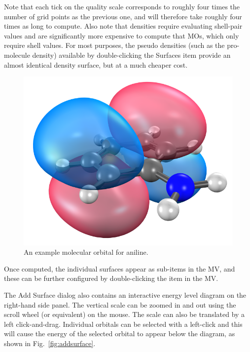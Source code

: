 \documentclass[a4paper,12pt]{article}
\begin{document}
Note that each tick on the quality scale corresponds to roughly four times the
number of grid points as the previous one, and will therefore take roughly four
times as long to compute.  Also note that densities require evaluating
shell-pair values and are significantly more expensive to compute that MOs,
which only require shell values.  For most purposes, the pseudo densities (such
as the pro-molecule density) available by double-clicking the Surfaces item
provide an almost identical density surface, but at a much cheaper cost.

\begin{figure}[h]
\begin{center}
\includegraphics[scale=0.32]{figures/Orbital.png}
\caption{An example molecular orbital for aniline.}
\label{fig:mo}
\end{center}
\end{figure}

Once computed, the individual surfaces appear as sub-items in the MV, and these
can be further configured by double-clicking the item in the MV.

The Add Surface dialog also contains an interactive energy level diagram on the
right-hand side panel.  The vertical scale can be zoomed in and out using the
scroll wheel (or equivalent) on the mouse.  The scale can also be translated by
a left click-and-drag.  Individual orbitals can be selected with a left-click
and this will cause the energy of the selected orbital to appear below the
diagram, as shown in Fig.~\ref{fig:addsurface}.
\end{document}
